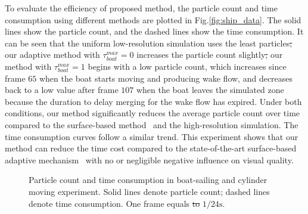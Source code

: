 \documentclass[VANCOUVER,STIX1COL]{WileyNJD-v2}
\providecommand{\DIFadd}[1]{{\protect\color{blue}\uwave{#1}}} %
\providecommand{\DIFdel}[1]{{\protect\color{red}\sout{#1}}}                      %
\providecommand{\DIFaddbegin}{} %
\providecommand{\DIFaddend}{} %
\providecommand{\DIFdelbegin}{} %
\providecommand{\DIFdelend}{} %
\providecommand{\DIFdelFL}[1]{\DIFdel{#1}} %
\providecommand{\DIFaddbeginFL}{} %
\providecommand{\DIFaddendFL}{} %
\providecommand{\DIFdelbeginFL}{} %
\providecommand{\DIFdelendFL}{} %
\begin{document}
\DIFdelend To evaluate the efficiency of \DIFaddbegin \DIFadd{the }\DIFaddend proposed method, the particle count and time consumption using different methods are plotted in Fig.\ref{fig:ship_data}. The solid lines show the particle count, and the dashed lines show the time consumption. It can be seen that the uniform low-resolution simulation uses the least particles\DIFdelbegin \DIFdel{; }\DIFdelend \DIFaddbegin \DIFadd{. While }\DIFaddend our adaptive method with $\tau_{boat}^{max} = 0$ increases the particle count slightly\DIFdelbegin \DIFdel{; }\DIFdelend \DIFaddbegin \DIFadd{. Further, }\DIFaddend our method with $\tau_{boat}^{max} = 1$ begins with a low particle count, which increases since frame $65$ when the boat starts moving and producing wake flow, and decreases back to a low value after frame $107$ when the boat leaves the simulated zone because the duration to delay merging for the wake flow has expired. Under both conditions, our method significantly reduces the average particle count over time compared to the surface-based method~\cite{Winchenbach17} and the high-resolution simulation. The time consumption curves follow a similar trend. This experiment shows that our method can reduce the time cost compared to the state-of-the-art surface-based adaptive mechanism~\cite{Winchenbach17} with no or negligible negative influence on visual quality.

\begin{figure}
    \centering
    \DIFdelbeginFL %
\DIFdelendFL \DIFaddbeginFL {}
    \DIFaddendFL \vspace{-0.7\baselineskip}
    \caption{Particle count and time consumption in boat-sailing and cylinder moving experiment. Solid lines denote particle count; dashed lines denote time consumption. One frame equals \DIFdelbeginFL \DIFdelFL{to }\DIFdelendFL $1/24\mathrm{s}$.}

\end{figure}
\end{document}
